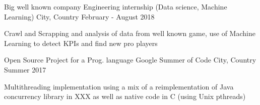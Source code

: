 \begin{cventries}
	
	
	
	\cventry
	{Big well known company} %
	{Engineering internship (Data science, Machine Learning)} %
	{City, Country} %
	{February - August 2018} %
	{ %
		\begin{cvitems}
			\item {Crawl and Scrapping and analysis of data from well known game, use of Machine Learning to detect KPIs and find new pro players}
		\end{cvitems}
	}
	

	\cventry
	{Open Source Project for a Prog. language} %
	{Google Summer of Code} %
	{City, Country} %
	{Summer 2017} %
	{ %
		\begin{cvitems}
			\item {Multithreading implementation using a mix of a reimplementation of Java concurrency library in XXX as well as native code in C (using Unix pthreads)}
		\end{cvitems}
	}
	
	
	
	

\end{cventries}
